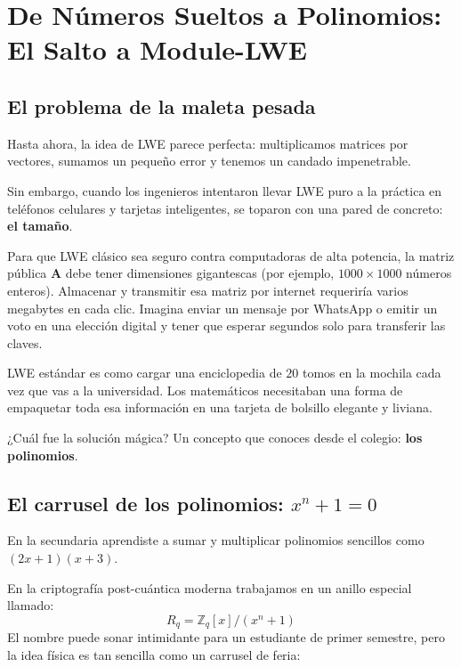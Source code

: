\chapter{De Números Sueltos a Polinomios: El Salto a Module-LWE}
\label{cap:polinomios_modulos}

\section{El problema de la maleta pesada}

Hasta ahora, la idea de LWE parece perfecta: multiplicamos matrices por vectores, sumamos un pequeño error y tenemos un candado impenetrable. 

Sin embargo, cuando los ingenieros intentaron llevar LWE puro a la práctica en teléfonos celulares y tarjetas inteligentes, se toparon con una pared de concreto: \textbf{el tamaño}.

Para que LWE clásico sea seguro contra computadoras de alta potencia, la matriz pública $\mathbf{A}$ debe tener dimensiones gigantescas (por ejemplo, $1000 \times 1000$ números enteros). Almacenar y transmitir esa matriz por internet requeriría varios megabytes en cada clic. Imagina enviar un mensaje por WhatsApp o emitir un voto en una elección digital y tener que esperar segundos solo para transferir las claves.

\begin{metafora}
LWE estándar es como cargar una enciclopedia de $20$ tomos en la mochila cada vez que vas a la universidad. Los matemáticos necesitaban una forma de empaquetar toda esa información en una tarjeta de bolsillo elegante y liviana.
\end{metafora}

¿Cuál fue la solución mágica? Un concepto que conoces desde el colegio: \textbf{los polinomios}.

\section{El carrusel de los polinomios: \texorpdfstring{$x^n + 1 = 0$}{x\textasciicircum n + 1 = 0}}

En la secundaria aprendiste a sumar y multiplicar polinomios sencillos como $(2x + 1)(x + 3)$. 

En la criptografía post-cuántica moderna trabajamos en un anillo especial llamado:
\[
R_q = \mathbb{Z}_q[x]/(x^n + 1)
\]
El nombre puede sonar intimidante para un estudiante de primer semestre, pero la idea física es tan sencilla como un carrusel de feria:

